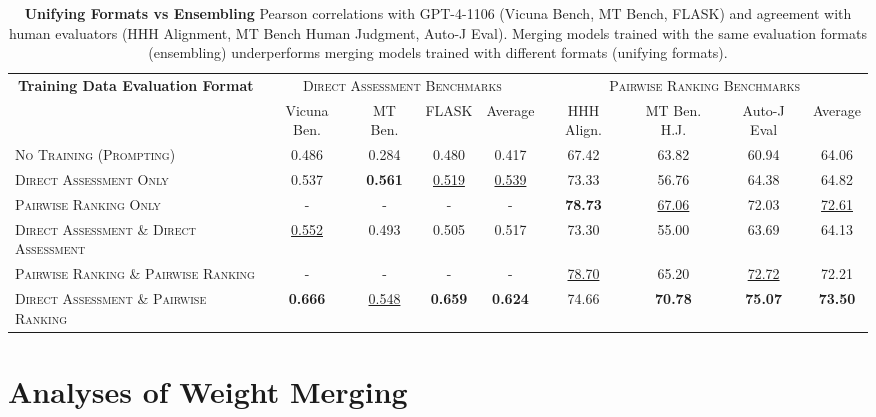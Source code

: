 \documentclass[11pt]{article}
\begin{document}
\begin{table}[t!]
\centering
\fontsize{6.5}{9}\selectfont
\begin{tabular}{lcccccccc}
    \toprule
     \multicolumn{1}{c}{\multirow{2}{*}{\textbf{Training Data Evaluation Format}}}&\multicolumn{4}{c}{\textsc{Direct Assessment Benchmarks}} & \multicolumn{4}{c}{\textsc{Pairwise Ranking Benchmarks}}\\ 
    \cmidrule(lr){2-5} \cmidrule(lr){6-9} &Vicuna Ben. & MT Ben. & FLASK & Average & HHH Align. & MT Ben. H.J. & Auto-J Eval & Average\\
    \midrule
    \textsc{No Training (Prompting)} & 0.486 & 0.284 & 0.480 & 0.417 &67.42&63.82&60.94&64.06\\
    \midrule
    \textsc{Direct Assessment Only} & 0.537 & \textbf{0.561} & \underline{0.519}  & \underline{0.539} & 73.33 & 56.76 & 64.38 & 64.82\\
    \textsc{Pairwise Ranking Only} &  - & - & - & - & \textbf{78.73} & \underline{67.06} & 72.03&\underline{72.61}\\
    \midrule
    \textsc{Direct Assessment \& Direct Assessment} & \underline{0.552} &0.493 &0.505 & 0.517 & 73.30 & 55.00 &63.69 &64.13\\
    \textsc{Pairwise Ranking \& Pairwise Ranking}&-&-&-&-&\underline{78.70}&65.20&\underline{72.72}&72.21\\
    \midrule
    \textsc{Direct Assessment \& Pairwise Ranking}& \textbf{0.666} & \underline{0.548} & \textbf{0.659} & \textbf{0.624} & 74.66 & \textbf{70.78} & \textbf{75.07}&\textbf{73.50} \\
    \bottomrule    
\end{tabular}
\caption{\footnotesize \textbf{Unifying Formats vs Ensembling} Pearson correlations with GPT-4-1106 (Vicuna Bench, MT Bench, FLASK) and agreement with human evaluators (HHH Alignment, MT Bench Human Judgment, Auto-J Eval). Merging models trained with the same evaluation formats (ensembling) underperforms merging models trained with different formats (unifying formats).}
\label{table:merging_ablations}
\end{table}  








\section{Analyses of Weight Merging}\label{sec:weight_merging_analysis}
\end{document}

